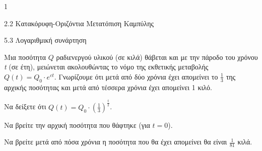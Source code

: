 \begin{ylh}{1}
\item 2.2 Κατακόρυφη-Οριζόντια Μετατόπιση Καμπύλης
\item 5.3 Λογαριθμική συνάρτηση
\end{ylh}
Μια ποσότητα $Q$ ραδιενεργού υλικού (σε κιλά) θάβεται και με την πάροδο του χρόνου \emph{t} (σε έτη), μειώνεται ακολουθώντας το νόμο της εκθετικής μεταβολής $Q(t) = Q_0 \cdot e^{ct}$. Γνωρίζουμε ότι μετά από δύο χρόνια έχει απομείνει το $\frac{1}{3}$ της αρχικής ποσότητας και μετά από τέσσερα χρόνια έχει απομείνει 1 κιλό.
\begin{alist}
\item Να δείξετε ότι $Q(t) = Q_0 \cdot \left(\frac{1}{3}\right)^{\frac{t}{2}}$.
\item Να βρείτε την αρχική ποσότητα που θάφτηκε (για $t=0$).
\item Να βρείτε μετά από πόσα χρόνια η ποσότητα που θα έχει απομείνει θα είναι $\frac{1}{81}$ κιλά.
\end{alist}

